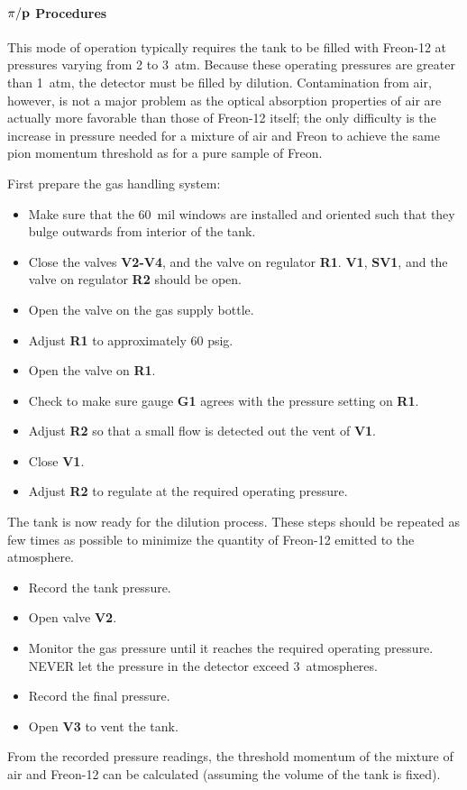 \paragraph{$\bf{\pi}/p$ Procedures}
This mode of operation typically requires the tank to be filled with Freon-12
at pressures varying from 2 to 3~atm.  Because these operating pressures are
greater than 1~atm, the detector must be filled by dilution.  Contamination
from air, however, is not a major problem as the optical absorption properties
of air are actually more favorable than those of Freon-12 itself; the only
difficulty is the increase in pressure needed for a mixture of air and Freon
to achieve the same pion momentum threshold as for a pure sample of Freon.

First prepare the gas handling system:
\begin{itemize}
\item Make sure that the 60~mil windows are installed and oriented such that
they bulge outwards from interior of the tank.
\item Close the valves {\bf V2-V4}, and the valve on regulator {\bf R1}.
{\bf V1}, {\bf SV1}, and the valve on regulator {\bf R2} should be
open.
\item Open the valve on the gas supply bottle.
\item Adjust {\bf R1} to approximately 60 psig.
\item Open the valve on {\bf R1}.
\item Check to make sure gauge {\bf G1} agrees with the pressure setting
on {\bf R1}.
\item Adjust {\bf R2} so that a small flow is detected out the vent of
{\bf V1}.
\item Close {\bf V1}.
\item Adjust {\bf R2} to regulate at the required operating pressure.
\end{itemize}
The tank is now ready for the dilution process.  These steps should be
repeated as few times as possible to minimize the quantity of Freon-12 emitted
to the atmosphere.
\begin{itemize}
\item Record the tank pressure.
\item Open valve {\bf V2}.
\item Monitor the gas pressure until it reaches the required operating pressure.
NEVER let the pressure in the detector exceed 3~atmospheres.
\item Record the final pressure.
\item Open {\bf V3} to vent the tank.
\end{itemize}
From the recorded pressure readings, the threshold momentum of the mixture
of air and Freon-12 can be calculated (assuming the volume of the tank is
fixed).



